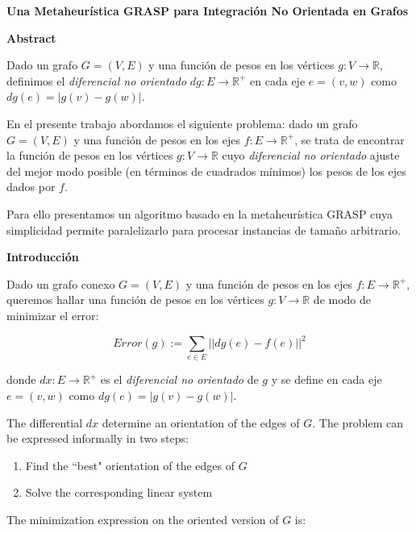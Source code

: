 \documentclass[a4paper,11pt]{article}
\begin{document}
\textbf{Una Metaheurística GRASP para Integración No Orientada en Grafos}

\bigskip

\textbf{Abstract}
 
\bigskip

Dado un grafo $G=(V,E)$ y una función de pesos en los vértices $g: V 
\rightarrow \mathbb{R}$, definimos el \textit{diferencial no orientado} 
$dg: E \rightarrow \mathbb{R}^+$ en cada eje $e=(v,w)$ como $dg(e) = 
|g(v) - g(w)|$.

\smallskip

En el presente trabajo abordamos el siguiente problema: dado un grafo 
$G=(V,E)$ y una función de pesos en los ejes $f: E \rightarrow 
\mathbb{R}^+$, se trata de encontrar la función de pesos en los vértices 
$g: V \rightarrow \mathbb{R}$ cuyo \textit{diferencial no orientado} 
ajuste del mejor modo posible (en términos de cuadrados mínimos) los 
pesos de los ejes dados por $f$.

\smallskip

Para ello presentamos un algoritmo basado en la metaheurística GRASP 
cuya simplicidad permite paralelizarlo para procesar instancias de 
tamaño arbitrario.

\bigskip

\textbf{Introducción}

\bigskip

Dado un grafo conexo $G=(V,E)$ y una función de pesos en los ejes 
$f: E \rightarrow \mathbb{R}^+$, queremos hallar una función de pesos 
en los vértices $g: V \rightarrow \mathbb{R}$ de modo de minimizar el 
error:

$$Error(g) := \sum_{e \in E} ||dg(e) - f(e)||^2$$

donde $dx: E \rightarrow \mathbb{R}^+$ es el \textit{diferencial 
no orientado} de $g$ y se define en cada eje $e=(v,w)$ como $dg(e) = 
|g(v) - g(w)|$.

\bigskip


The differential $dx$ determine an orientation of the edges of $G$. 
The problem can be expressed informally in two steps:

\begin{enumerate}
\item Find the ``best" orientation of the edges of $G$
\item Solve the corresponding linear system
\end{enumerate}

The minimization expression on the oriented version of $G$ is: 
\end{document}
